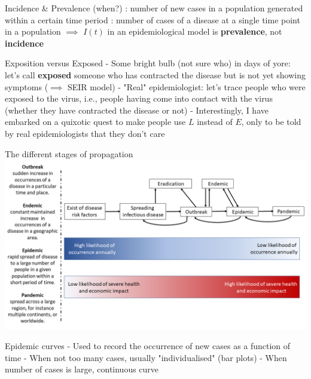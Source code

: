 \documentclass[aspectratio=43]{beamer}
\begin{document}
\begin{frame}{Incidence \& Prevalence (when?)}
: number of new cases in a population generated within a certain time period
\vfill
{}: number of cases of a disease at a single time point in a population
\vfill
$\implies$ $I(t)$ in an epidemiological model is \textbf{prevalence}, not \textbf{incidence}
\end{frame}

\begin{frame}{Exposition versus Exposed}
- Some bright bulb (not sure who) in days of yore: let's call \textbf{exposed} someone who has contracted the disease but is not yet showing symptoms ($\implies$ SEIR model)
\vfill
- "Real" epidemiologist: let's trace people who were exposed to the virus, i.e., people having come into contact with the virus (whether they have contracted the disease or not)
\vfill
- Interestingly, I have embarked on a quixotic quest to make people use $L$ instead of $E$, only to be told by real epidemiologists that they don't care \code{:)}
\end{frame}


\begin{frame}{The different stages of propagation}
        \includegraphics[width=\textwidth]{../FIGS/Difference_between_outbreak,_endemic,_epidemic_and_pandemic-en.png}
\end{frame}
        


\begin{frame}{Epidemic curves}
- Used to record the occurrence of new cases as a function of time
\vfill
- When not too many cases, usually "individualised" (bar plots)
\vfill
- When number of cases is large, continuous curve
\end{frame}
\end{document}
